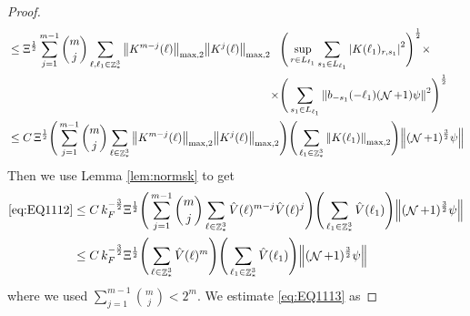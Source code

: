 \documentclass[sn-mathphys, Numbered ,a4paper]{sn-jnl}%
\DeclareMathOperator{\Z}{\mathbb{Z}}
\DeclareMathOperator{\NN}{\mathcal{N}}
\newcommand{\half}{\frac{1}{2}}
\theoremstyle{plain}
\theoremstyle{definition}
\theoremstyle{remark}
\theoremstyle{plain}
\theoremstyle{definition}
\theoremstyle{remark}
\begin{document}
\begin{proof}
\begin{alignat}{2}
	&\leq \Xi^\half \sum\limits_{j=1}^{m-1} {{m}\choose j} \sum\limits_{\ell, \ell_1\in \Z^3_*} \norm{K^{m-j}(\ell)}_{\mathrm{max,2}} \norm{K^{j}(\ell)}_{\mathrm{max,2}} \begin{aligned}[t]&\Bigg(\sup_{r \in L_{\ell_1}} \sum\limits_{ s_1 \in L_{\ell_1}}\abs{  K(\ell_1)_{r,s_1} }^2\Bigg)^\half \times \nonumber \\ \times &\Bigg(  \sum\limits_{ s_1 \in L_{\ell_1}}\norm{   b_{-s_1}(-\ell_1)  (\NN+1)\psi} ^2\Bigg)^\half \end{aligned}\nonumber\\
	&\leq C\,\Xi^\half \Bigg(\sum\limits_{j=1}^{m-1} {{m}\choose j} \sum\limits_{\ell \in \Z^3_*} \norm{K^{m-j}(\ell)}_{ \mathrm{max,2} } \norm{K^{j}(\ell)}_{\mathrm{max,2}}\Bigg) \Bigg(\sum\limits_{ \ell_1\in \Z^3_*}\norm{  K(\ell_1)}_{\mathrm{max,2}}\Bigg)  \norm{(\NN+1)^\frac{3}{2} \psi} \nonumber
\end{alignat} 
Then we use Lemma \ref{lem:normsk} to get
\begin{align}
	\eqref{eq:EQ1112} &\leq C\, k_{F}^{-\frac{3}{2}}\Xi^\half \Bigg(\sum\limits_{j=1}^{m-1} {{m}\choose j} \sum\limits_{\ell \in \Z^3_*} \hat{V}(\ell)^{m-j} \hat{V}(\ell)^{j} \Bigg) \Bigg(\sum\limits_{ \ell_1\in \Z^3_*}\hat{V}(\ell_1)\Bigg)  \norm{(\NN+1)^\frac{3}{2} \psi} \nonumber\\
	&\leq C\, k_{F}^{-\frac{3}{2}}\Xi^\half \Bigg(\sum\limits_{\ell \in \Z^3_*} \hat{V}(\ell)^{m} \Bigg) \Bigg(\sum\limits_{ \ell_1\in \Z^3_*}\hat{V}(\ell_1)\Bigg)  \norm{(\NN+1)^\frac{3}{2} \psi} \label{eq:estEQ1112}
\end{align}
where we used $\sum\limits_{j=1}^{m-1} {{m}\choose j} < 2^{m} $.
We estimate \eqref{eq:EQ1113} as
\begin{comment}
	\begin{align}*(2 max,2 squared)
		&\eqref{eq:EQ1113}\nonumber\\
		&\leq\sum\limits_{\ell, \ell_1\in \Z^3_*} \mathds{1}_{L_{\ell_1}}(q) \mathds{1}_{L_{\ell}}(q) \norm{\sum\limits_{s \in L_{\ell},s_1\in L_{\ell_1}} K^m(\ell)_{q,s}K(\ell_1)_{q,s_1} b_{-s_1}(-\ell_1) b_{s}(\ell) a_{q-\ell_1}\psi}\norm{ a_{q-\ell}\psi }\nonumber\\
		&\leq\sum\limits_{\ell, \ell_1\in \Z^3_*} \mathds{1}_{L_{\ell_1}}(q) \mathds{1}_{L_{\ell}}(q) \Bigg(\sum\limits_{s \in L_{\ell}}\abs{K^m(\ell)_{q,s}}^2\Bigg)^\half \Bigg(\sum\limits_{s \in L_{\ell}}\norm{\sum\limits_{s_1\in L_{\ell_1}} K(\ell_1)_{q,s_1} b_{-s_1}(-\ell_1) b_{s}(\ell) a_{q-\ell_1}\psi}^2\Bigg)^\half \norm{ a_{q-\ell}\psi }\nonumber\\

\end{comment}
\end{proof}
\end{document}

